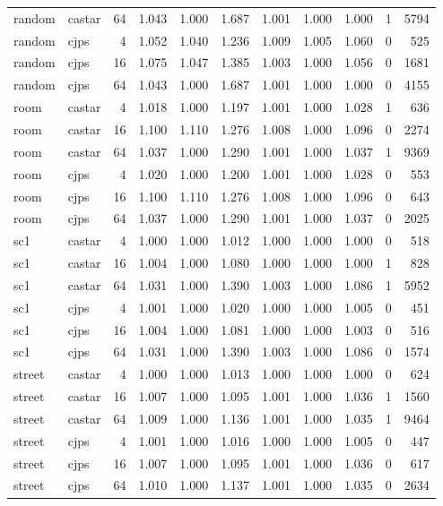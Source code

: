 \begin{tabular}{llr rrr rrr rr}
random & castar & 64 & 1.043 & 1.000 & 1.687 & 1.001 & 1.000 & 1.000 & 1 & 5794\\
random & cjps & 4 & 1.052 & 1.040 & 1.236 & 1.009 & 1.005 & 1.060 & 0 & 525\\
random & cjps & 16 & 1.075 & 1.047 & 1.385 & 1.003 & 1.000 & 1.056 & 0 & 1681\\
random & cjps & 64 & 1.043 & 1.000 & 1.687 & 1.001 & 1.000 & 1.000 & 0 & 4155\\
room & castar & 4 & 1.018 & 1.000 & 1.197 & 1.001 & 1.000 & 1.028 & 1 & 636\\
room & castar & 16 & 1.100 & 1.110 & 1.276 & 1.008 & 1.000 & 1.096 & 0 & 2274\\
room & castar & 64 & 1.037 & 1.000 & 1.290 & 1.001 & 1.000 & 1.037 & 1 & 9369\\
room & cjps & 4 & 1.020 & 1.000 & 1.200 & 1.001 & 1.000 & 1.028 & 0 & 553\\
room & cjps & 16 & 1.100 & 1.110 & 1.276 & 1.008 & 1.000 & 1.096 & 0 & 643\\
room & cjps & 64 & 1.037 & 1.000 & 1.290 & 1.001 & 1.000 & 1.037 & 0 & 2025\\
sc1 & castar & 4 & 1.000 & 1.000 & 1.012 & 1.000 & 1.000 & 1.000 & 0 & 518\\
sc1 & castar & 16 & 1.004 & 1.000 & 1.080 & 1.000 & 1.000 & 1.000 & 1 & 828\\
sc1 & castar & 64 & 1.031 & 1.000 & 1.390 & 1.003 & 1.000 & 1.086 & 1 & 5952\\
sc1 & cjps & 4 & 1.001 & 1.000 & 1.020 & 1.000 & 1.000 & 1.005 & 0 & 451\\
sc1 & cjps & 16 & 1.004 & 1.000 & 1.081 & 1.000 & 1.000 & 1.003 & 0 & 516\\
sc1 & cjps & 64 & 1.031 & 1.000 & 1.390 & 1.003 & 1.000 & 1.086 & 0 & 1574\\
street & castar & 4 & 1.000 & 1.000 & 1.013 & 1.000 & 1.000 & 1.000 & 0 & 624\\
street & castar & 16 & 1.007 & 1.000 & 1.095 & 1.001 & 1.000 & 1.036 & 1 & 1560\\
street & castar & 64 & 1.009 & 1.000 & 1.136 & 1.001 & 1.000 & 1.035 & 1 & 9464\\
street & cjps & 4 & 1.001 & 1.000 & 1.016 & 1.000 & 1.000 & 1.005 & 0 & 447\\
street & cjps & 16 & 1.007 & 1.000 & 1.095 & 1.001 & 1.000 & 1.036 & 0 & 617\\
street & cjps & 64 & 1.010 & 1.000 & 1.137 & 1.001 & 1.000 & 1.035 & 0 & 2634\\
\bottomrule\end{tabular}
